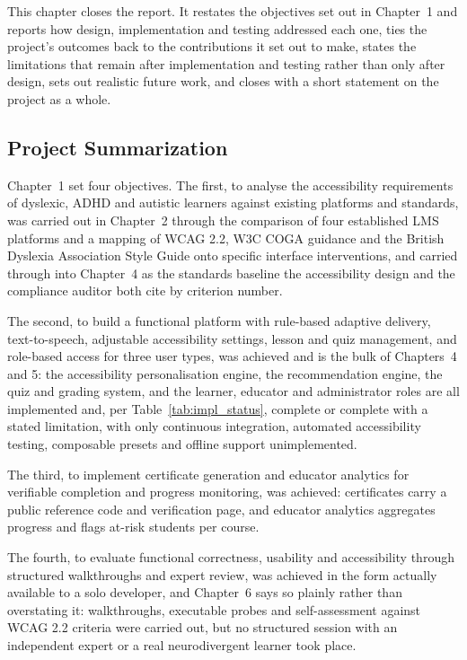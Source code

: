 \documentclass[12pt, oneside]{article} %
\begin{document}
This chapter closes the report. It restates the objectives set out in Chapter~1 and reports how design, implementation and testing addressed each one, ties the project's outcomes back to the contributions it set out to make, states the limitations that remain after implementation and testing rather than only after design, sets out realistic future work, and closes with a short statement on the project as a whole.

\subsection{Project Summarization}

Chapter~1 set four objectives. The first, to analyse the accessibility requirements of dyslexic, ADHD and autistic learners against existing platforms and standards, was carried out in Chapter~2 through the comparison of four established LMS platforms and a mapping of WCAG 2.2, W3C COGA guidance and the British Dyslexia Association Style Guide onto specific interface interventions, and carried through into Chapter~4 as the standards baseline the accessibility design and the compliance auditor both cite by criterion number.

The second, to build a functional platform with rule-based adaptive delivery, text-to-speech, adjustable accessibility settings, lesson and quiz management, and role-based access for three user types, was achieved and is the bulk of Chapters~4 and 5: the accessibility personalisation engine, the recommendation engine, the quiz and grading system, and the learner, educator and administrator roles are all implemented and, per Table~\ref{tab:impl_status}, complete or complete with a stated limitation, with only continuous integration, automated accessibility testing, composable presets and offline support unimplemented.

The third, to implement certificate generation and educator analytics for verifiable completion and progress monitoring, was achieved: certificates carry a public reference code and verification page, and educator analytics aggregates progress and flags at-risk students per course.

The fourth, to evaluate functional correctness, usability and accessibility through structured walkthroughs and expert review, was achieved in the form actually available to a solo developer, and Chapter~6 says so plainly rather than overstating it: walkthroughs, executable probes and self-assessment against WCAG 2.2 criteria were carried out, but no structured session with an independent expert or a real neurodivergent learner took place.
\end{document}
